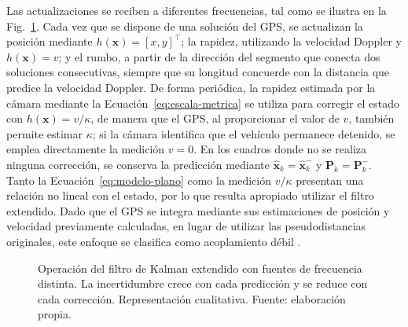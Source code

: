 Las actualizaciones se reciben a diferentes frecuencias, tal como se ilustra en la Fig.~\ref{fig:ekf-multitasa}.
Cada vez que se dispone de una solución del GPS, se actualizan la posición mediante $h(\mathbf{x}) = [x, y]^{\top}$; la rapidez, utilizando la velocidad Doppler y $h(\mathbf{x}) = v$; y el rumbo, a partir de la dirección del segmento que conecta dos soluciones consecutivas, siempre que su longitud concuerde con la distancia que predice la velocidad Doppler.
De forma periódica, la rapidez estimada por la cámara mediante la Ecuación~\eqref{eq:escala-metrica} se utiliza para corregir el estado con $h(\mathbf{x}) = v/\kappa$, de manera que el GPS, al proporcionar el valor de $v$, también permite estimar $\kappa$; si la cámara identifica que el vehículo permanece detenido, se emplea directamente la medición $v = 0$.
En los cuadros donde no se realiza ninguna corrección, se conserva la predicción mediante $\hat{\mathbf{x}}_k = \hat{\mathbf{x}}_k^{-}$ y $\mathbf{P}_k = \mathbf{P}_k^{-}$.
Tanto la Ecuación~\eqref{eq:modelo-plano} como la medición $v/\kappa$ presentan una relación no lineal con el estado, por lo que resulta apropiado utilizar el filtro extendido.
Dado que el GPS se integra mediante sus estimaciones de posición y velocidad previamente calculadas, en lugar de utilizar las pseudodistancias originales, este enfoque se clasifica como acoplamiento débil \cite{groves2013gnss}.



\begin{figure}[H]
\centering
{}
\caption[Operación del filtro con frecuencias distintas]{Operación del filtro de Kalman extendido con fuentes de frecuencia distinta. La incertidumbre crece con cada predicción y se reduce con cada corrección. Representación cualitativa. Fuente: elaboración propia.}
\label{fig:ekf-multitasa}
\end{figure}

